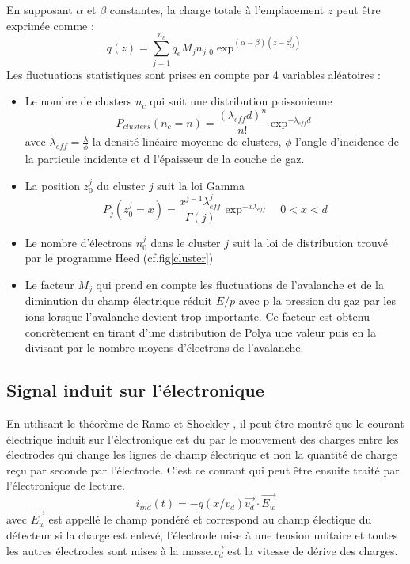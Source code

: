 En supposant $\alpha$ et $\beta$ constantes, la charge totale à l'emplacement $z$ peut être exprimée comme :
\begin{equation}
q(z)=\sum_{j=1}^{n_c}q_{e}M_{j}n_{j,0}\exp^{(\alpha-\beta)(z-z_O^j)}
\end{equation}
Les fluctuations statistiques sont prises en compte par 4 variables aléatoires :
\begin{itemize}[label=$\bullet$]
	\item Le nombre de clusters $n_c$ qui suit une distribution poissonienne 
	\begin{equation}
	P_{clusters}(n_c=n)=\frac{(\lambda_{eff}d)^{n}}{n!}\exp^{-\lambda_{eff}d}
	\end{equation}
	avec $\lambda_{eff}=\frac{\lambda}{\phi}$ la densité linéaire moyenne de clusters, $\phi$ l'angle d'incidence de la particule incidente et d l'épaisseur de la couche de gaz.
	\item La position $z_0^j$ du cluster $j$ suit la loi Gamma
	\begin{equation}
	P_{j}(z_0^j=x)=\frac{x^{j-1}\lambda_{eff}^{j}}{\Gamma(j)}\exp^{-x\lambda_{eff}} \quad 0<x<d
	\end{equation}
	\item Le nombre d'électrons $n_{0}^{j}$ dans le cluster $j$ suit la loi de distribution trouvé par le programme Heed (cf.fig\ref{cluster}) 
	\item Le facteur $M_{j}$ qui prend en compte les fluctuations de l'avalanche et de la diminution du champ électrique réduit $E/p$ avec p la pression du gaz par les ions lorsque l'avalanche devient trop importante. Ce facteur est obtenu concrètement en tirant d'une distribution de Polya une valeur puis en la divisant par le nombre moyens d'électrons de l'avalanche.
\end{itemize}

\subsection{Signal induit sur l'électronique}
En utilisant le théorème de Ramo et Shockley \cite{HE2001250}, il peut être montré que le courant électrique induit sur l'électronique est du  par le mouvement des charges entre les électrodes qui change les lignes de champ électrique et non la quantité de charge reçu par seconde par l'électrode. C'est ce courant qui peut être ensuite traité par l'électronique de lecture.
\begin{equation}
i_{ind}(t)=-q(x/v_{d})\vec{v_{d}}\cdot \vec{E_{w}}
\end{equation}
avec $\vec{E_{w}}$ est appellé le champ pondéré et correspond au champ électique du détecteur si la charge est enlevé, l'électrode mise à une tension unitaire  et toutes les autres électrodes sont mises à la masse.$\vec{v_{d}}$ est la vitesse de dérive des charges.

